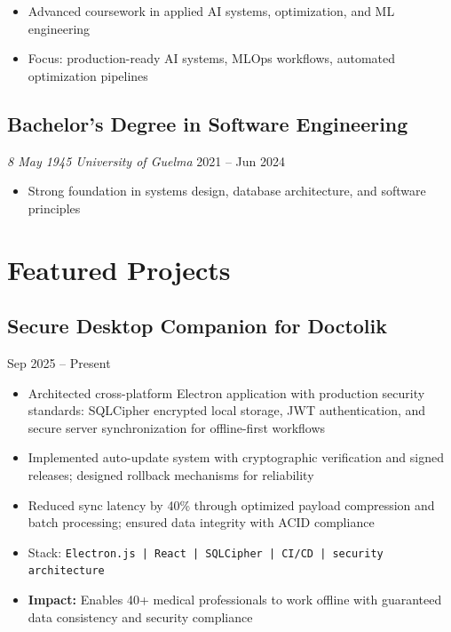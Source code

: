 \documentclass[11pt,a4paper]{article}
\newcommand{\company}[1]{\textit{#1}}
\newcommand{\dates}[1]{\hfill{\color{gray}\small #1}}
\newcommand{\tech}[1]{{\color{darkblue}\small\texttt{#1}}}
\begin{document}
\begin{itemize}
    \item Advanced coursework in applied AI systems, optimization, and ML engineering
    \item Focus: production-ready AI systems, MLOps workflows, automated optimization pipelines
\end{itemize}

\vspace{3pt}

\subsection{Bachelor's Degree in Software Engineering}
\company{8 May 1945 University of Guelma} \dates{2021 – Jun 2024}

\begin{itemize}
    \item Strong foundation in systems design, database architecture, and software principles
\end{itemize}

\vspace{6pt}

\section{Featured Projects}

\subsection{Secure Desktop Companion for Doctolik}
\dates{Sep 2025 – Present}

\begin{itemize}
    \item Architected cross-platform Electron application with production security standards: SQLCipher encrypted local storage, JWT authentication, and secure server synchronization for offline-first workflows
    \item Implemented auto-update system with cryptographic verification and signed releases; designed rollback mechanisms for reliability
    \item Reduced sync latency by 40\% through optimized payload compression and batch processing; ensured data integrity with ACID compliance
    \item Stack: \tech{Electron.js | React | SQLCipher | CI/CD | security architecture}
    \item \textbf{Impact:} Enables 40+ medical professionals to work offline with guaranteed data consistency and security compliance
\end{itemize}
\end{document}
